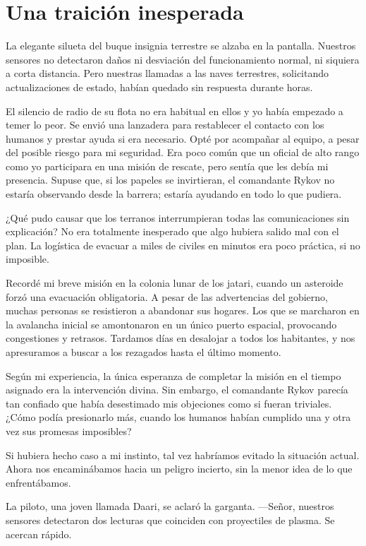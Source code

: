 \chapter{Una traición inesperada}

La elegante silueta del buque insignia terrestre se alzaba en la pantalla. Nuestros sensores no detectaron daños ni desviación del funcionamiento normal, ni siquiera a corta distancia. Pero nuestras llamadas a las naves terrestres, solicitando actualizaciones de estado, habían quedado sin respuesta durante horas.

El silencio de radio de su flota no era habitual en ellos y yo había empezado a temer lo peor. Se envió una lanzadera para restablecer el contacto con los humanos y prestar ayuda si era necesario. Opté por acompañar al equipo, a pesar del posible riesgo para mi seguridad. Era poco común que un oficial de alto rango como yo participara en una misión de rescate, pero sentía que les debía mi presencia. Supuse que, si los papeles se invirtieran, el comandante Rykov no estaría observando desde la barrera; estaría ayudando en todo lo que pudiera.

¿Qué pudo causar que los terranos interrumpieran todas las comunicaciones sin explicación? No era totalmente inesperado que algo hubiera salido mal con el plan. La logística de evacuar a miles de civiles en minutos era poco práctica, si no imposible.

Recordé mi breve misión en la colonia lunar de los jatari, cuando un asteroide forzó una evacuación obligatoria. A pesar de las advertencias del gobierno, muchas personas se resistieron a abandonar sus hogares. Los que se marcharon en la avalancha inicial se amontonaron en un único puerto espacial, provocando congestiones y retrasos. Tardamos días en desalojar a todos los habitantes, y nos apresuramos a buscar a los rezagados hasta el último momento.

Según mi experiencia, la única esperanza de completar la misión en el tiempo asignado era la intervención divina. Sin embargo, el comandante Rykov parecía tan confiado que había desestimado mis objeciones como si fueran triviales. ¿Cómo podía presionarlo más, cuando los humanos habían cumplido una y otra vez sus promesas imposibles?

Si hubiera hecho caso a mi instinto, tal vez habríamos evitado la situación actual. Ahora nos encaminábamos hacia un peligro incierto, sin la menor idea de lo que enfrentábamos.

La piloto, una joven llamada Daari, se aclaró la garganta. —Señor, nuestros sensores detectaron dos lecturas que coinciden con proyectiles de plasma. Se acercan rápido.


